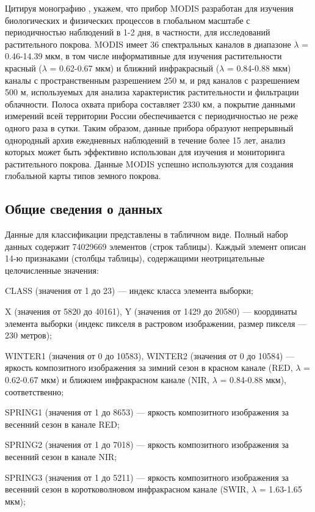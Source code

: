 \documentclass[14pt, a4paper, oneside]{extarticle}
\begin{document}
Цитируя монографию \cite{land-cover-mapping-monograph}, укажем, что прибор MODIS разработан для изучения биологических и физических процессов в глобальном масштабе с периодичностью наблюдений в 1-2 дня, в частности, для исследований растительного покрова. MODIS имеет 36 спектральных каналов в диапазоне $\lambda$ = 0.46-14.39 мкм, в том числе информативные для изучения растительности красный ($\lambda$ = 0.62-0.67 мкм) и ближний инфракрасный ($\lambda$ = 0.84-0.88 мкм) каналы с пространственным разрешением 250 м, и ряд каналов с разрешением 500 м, используемых для анализа характеристик растительности и фильтрации облачности. Полоса охвата прибора составляет 2330 км, а покрытие данными измерений всей территории России обеспечивается с периодичностью не реже одного раза в сутки. Таким образом, данные прибора образуют непрерывный однородный архив ежедневных наблюдений в течение более 15 лет, анализ которых может быть эффективно использован для изучения и мониторинга растительного покрова. Данные MODIS успешно используются для создания глобальной карты типов земного покрова.

\subsection{Общие сведения о данных}
Данные для классификации представлены в табличном виде. Полный набор данных содержит 74029669 элементов (строк таблицы). Каждый элемент описан 14-ю признаками (столбцы таблицы), содержащими неотрицательные целочисленные значения:

CLASS (значения от 1 до 23) --- индекс класса элемента выборки;

X (значения от 5820 до 40161), Y (значения от 1429 до 20580) --- координаты элемента выборки (индекс пикселя в растровом изображении, размер пикселя --- 230 метров);

WINTER1 (значения от 0 до 10583), WINTER2 (значения от 0 до 10584) --- яркость композитного изображения за зимний сезон в красном канале (RED, $\lambda$ = 0.62-0.67 мкм) и ближнем инфракрасном канале (NIR, $\lambda$ = 0.84-0.88 мкм), соответственно;

SPRING1 (значения от 1 до 8653) --- яркость композитного изображения за весенний сезон в канале RED;

SPRING2 (значения от 1 до 7018) --- яркость композитного изображения за весенний сезон в канале NIR;

SPRING3 (значения от 1 до 5211) --- яркость композитного изображения за весенний сезон в коротковолновом инфракрасном канале (SWIR, $\lambda$ = 1.63-1.65 мкм);
\end{document}
